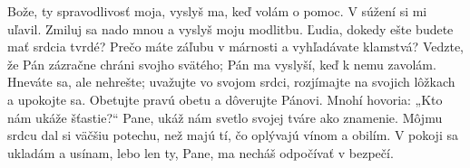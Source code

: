 Bože, ty spravodlivosť moja, vyslyš ma, keď volám o pomoc.
V súžení si mi uľavil.
\versseparator
Zmiluj sa nado mnou a vyslyš moju modlitbu.
\versseparator
Ľudia, dokedy ešte budete mať srdcia tvrdé?
Prečo máte záľubu v márnosti a vyhľadávate klamstvá?
\versseparator
Vedzte, že Pán zázračne chráni svojho svätého;
Pán ma vyslyší, keď k nemu zavolám.
\versseparator
Hneváte sa, ale nehrešte;
uvažujte vo svojom srdci,
rozjímajte na svojich lôžkach a upokojte sa.
\versseparator
Obetujte pravú obetu
a dôverujte Pánovi.
\versseparator
Mnohí hovoria: „Kto nám ukáže šťastie?“
Pane, ukáž nám svetlo svojej tváre ako znamenie.
\versseparator
Môjmu srdcu dal si väčšiu potechu,
než majú tí, čo oplývajú vínom a obilím.
\versseparator
V pokoji sa ukladám a usínam,
\versseparator
lebo len ty, Pane, ma necháš odpočívať v bezpečí.
